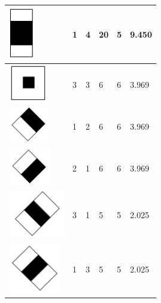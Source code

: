 \begin{table}[htbp]
\begin{tabular}{ | l | l | l | l | l | l | }
    \hline
        \hspace{27pt}\includegraphics[width=0.4\maxwidth]{../figures/h7.png}
        & 1 & 4 & 20 & 5 & 9.450\\
    \hline
        \hspace{25pt}\includegraphics[width=0.4\maxwidth]{../figures/h8.png}
        & 3 & 3 & 6 & 6 & 3.969 \\
    \hline
        \hspace{23pt}\includegraphics[width=0.4\maxwidth]{../figures/h9.png}
        & 1 & 2 & 6 & 6 & 3.969\\
    \hline
        \hspace{23pt}\includegraphics[width=0.4\maxwidth]{../figures/h10.png}
        & 2 & 1 & 6 & 6 & 3.969\\
    \hline
        \hspace{16pt}\includegraphics[width=0.4\maxwidth]{../figures/h11.png}
        & 3 & 1 & 5 & 5 & 2.025 \\
    \hline
        \hspace{16pt}\includegraphics[width=0.4\maxwidth]{../figures/h12.png}
        & 1 & 3 & 5 & 5 & 2.025 \\

\end{tabular}
\end{table}
